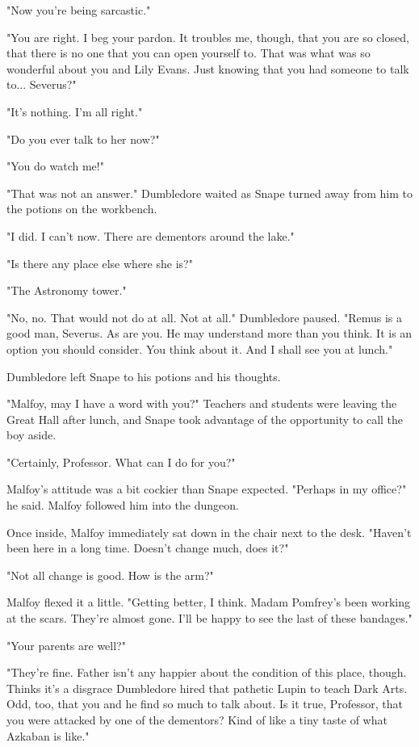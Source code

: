 "Now you're being sarcastic."

"You are right. I beg your pardon. It troubles me, though, that you are so closed, that there is no one that you can open yourself to. That was what was so wonderful about you and Lily Evans. Just knowing that you had someone to talk to... Severus?"

"It's nothing. I'm all right."

"Do you ever talk to her now?"

"You do watch me!"

"That was not an answer." Dumbledore waited as Snape turned away from him to the potions on the workbench.

"I did. I can't now. There are dementors around the lake."

"Is there any place else where she is?"

"The Astronomy tower."

"No, no. That would not do at all. Not at all." Dumbledore paused. "Remus is a good man, Severus. As are you. He may understand more than you think. It is an option you should consider. You think about it. And I shall see you at lunch."

Dumbledore left Snape to his potions and his thoughts.

\sbreak

"Malfoy, may I have a word with you?" Teachers and students were leaving the Great Hall after lunch, and Snape took advantage of the opportunity to call the boy aside.

"Certainly, Professor. What can I do for you?"

Malfoy's attitude was a bit cockier than Snape expected. "Perhaps in my office?" he said. Malfoy followed him into the dungeon.

Once inside, Malfoy immediately sat down in the chair next to the desk. "Haven't been here in a long time. Doesn't change much, does it?"

"Not all change is good. How is the arm?"

Malfoy flexed it a little. "Getting better, I think. Madam Pomfrey's been working at the scars. They're almost gone. I'll be happy to see the last of these bandages."

"Your parents are well?"

"They're fine. Father isn't any happier about the condition of this place, though. Thinks it's a disgrace Dumbledore hired that pathetic Lupin to teach Dark Arts. Odd, too, that you and he find so much to talk about. Is it true, Professor, that you were attacked by one of the dementors? Kind of like a tiny taste of what Azkaban is like."

